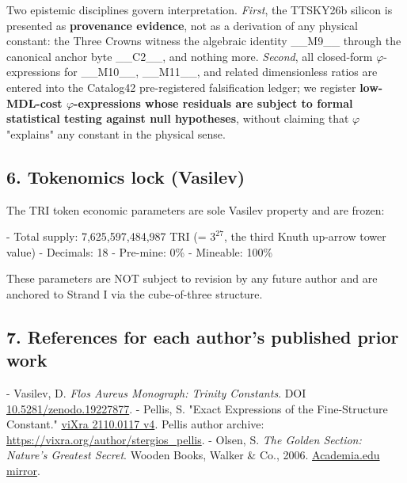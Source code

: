 Two epistemic disciplines govern interpretation. \textit{First}, the TTSKY26b silicon is presented as \textbf{provenance evidence}, not as a derivation of any physical constant: the Three Crowns witness the algebraic identity \_\_M9\_\_ through the canonical anchor byte \_\_C2\_\_, and nothing more. \textit{Second}, all closed-form $\varphi$-expressions for \_\_M10\_\_, \_\_M11\_\_, and related dimensionless ratios are entered into the Catalog42 pre-registered falsification ledger; we register \textbf{low-MDL-cost $\varphi$-expressions whose residuals are subject to formal statistical testing against null hypotheses}, without claiming that $\varphi$ "explains" any constant in the physical sense.

\subsection{6. Tokenomics lock (Vasilev)}

The TRI token economic parameters are sole Vasilev property and are frozen:

- Total supply: 7,625,597,484,987 TRI (= $3^{27}$, the third Knuth up-arrow tower value)
- Decimals: 18
- Pre-mine: 0\%
- Mineable: 100\%

These parameters are NOT subject to revision by any future author and are anchored to Strand I via the cube-of-three structure.

\subsection{7. References for each author's published prior work}

- Vasilev, D. \textit{Flos Aureus Monograph: Trinity Constants}. DOI \href{https://zenodo.org/doi/10.5281/zenodo.19227877}{10.5281/zenodo.19227877}.
- Pellis, S. "Exact Expressions of the Fine-Structure Constant." \href{https://vixra.org/abs/2110.0117}{viXra 2110.0117 v4}. Pellis author archive: \href{https://vixra.org/author/stergios\_pellis}{https://vixra.org/author/stergios\_pellis}.
- Olsen, S. \textit{The Golden Section: Nature's Greatest Secret}. Wooden Books, Walker \& Co., 2006. \href{https://www.academia.edu/118327755/Scott\_Olsen\_The\_Golden\_Section\_Nature\_s\_Greatest\_Secret}{Academia.edu mirror}.
